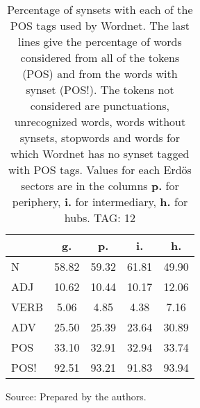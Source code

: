 \begin{table}[h!]
\begin{center}
	\caption{Percentage of synsets with each of the POS tags used by Wordnet. The last lines give the percentage of words considered from all of the tokens (POS) and from the words with synset (POS!). The tokens not considered are punctuations, unrecognized words, words without synsets, stopwords and words for which Wordnet has no synset  tagged with POS tags. Values for each Erd\"os sectors are in the columns {{\bf p.}} for periphery, {{\bf i.}} for intermediary, {{\bf h.}} for hubs. TAG: 12}\label{tab:wnpos}
\begin{tabular}{| l || c | c | c | c |}\hline
 & {\bf g.} & {\bf p.} & {\bf i.} & {\bf h.} \\\hline\hline
N & 58.82  & 59.32  & 61.81  & 49.90 \\\hline
ADJ & 10.62  & 10.44  & 10.17  & 12.06 \\\hline
VERB & 5.06  & 4.85  & 4.38  & 7.16 \\\hline
ADV & 25.50  & 25.39  & 23.64  & 30.89 \\\hline\hline
POS & 33.10  & 32.91  & 32.94  & 33.74 \\\hline
POS! & 92.51  & 93.21  & 91.83  & 93.94 \\\hline
\end{tabular}
\begin{flushleft}
		Source: Prepared by the authors.\
\end{flushleft}
\end{center}
\end{table}
